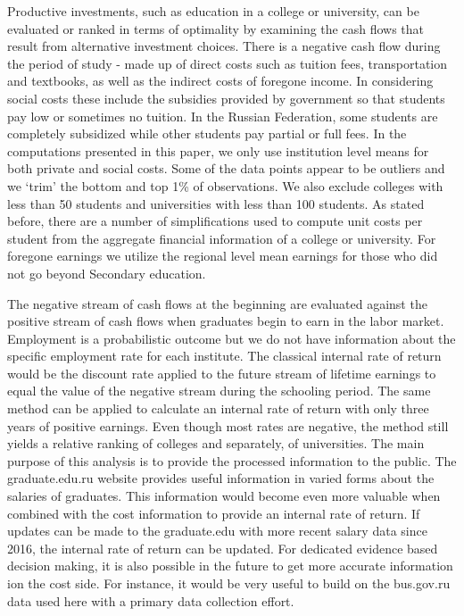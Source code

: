 \documentclass[alpha-refs]{wiley-article-05g}
\begin{document}
Productive investments, such as education in a college or university, can 
be evaluated or ranked in terms of optimality by examining the cash flows 
that result from alternative investment choices. There is a negative cash 
flow during the period of study - made up of direct costs such as tuition 
fees, transportation and textbooks, as well as the indirect costs of 
foregone income. In considering social costs these include the subsidies 
provided by government so that students pay low or sometimes no tuition. In 
the Russian Federation, some students are completely subsidized while other 
students pay partial or full fees. In the computations presented in this 
paper, we only use institution level means for both private and social 
costs. Some of the data points appear to be outliers and we `trim' the 
bottom and top 1\% of observations. We also exclude colleges with less than 
50 students and universities with less than 100 students. As stated before, 
there are a number of simplifications used to compute unit costs per 
student from the aggregate financial information of a college or 
university. For foregone earnings we utilize the regional level mean 
earnings for those who did not go beyond Secondary education. 

The negative stream of cash flows at the beginning are evaluated against the positive stream of cash flows when graduates begin to earn in the labor market. Employment is a probabilistic outcome but we do not have information about the specific employment rate for each institute. The classical internal rate of return would be the discount rate applied to the future stream of lifetime earnings to equal the value of the negative stream during the schooling period. The same method can be applied to calculate an internal rate of return with only three years of positive earnings. Even though most rates are negative, the method still yields a relative ranking of colleges and separately, of universities. The main purpose of this analysis is to provide the processed information to the public. The graduate.edu.ru website provides useful information in varied forms about the salaries of graduates. This information would become even more valuable when combined with the cost information to provide an internal rate of return. If updates can be made to the graduate.edu with more recent salary data since 2016, the internal rate of return can be updated. For dedicated evidence based decision making, it is also possible in the future to get more accurate information ion the cost side. For instance, it would be very useful to build on the bus.gov.ru data used here with a primary data collection effort. 
\end{document}
